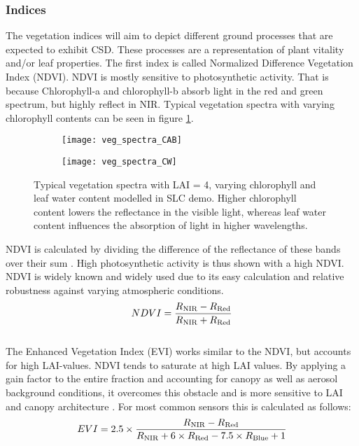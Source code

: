 \newpage
\subsubsection{Indices}
The vegetation indices will aim to depict different ground processes that are expected to exhibit CSD. These processes are a representation of plant vitality and/or leaf properties. The first index is called Normalized Difference Vegetation Index (NDVI). NDVI is mostly sensitive to photosynthetic activity. That is because Chlorophyll-a and chlorophyll-b absorb light in the red and green spectrum, but highly reflect in NIR. Typical vegetation spectra with varying chlorophyll contents can be seen in figure \ref{fig:vegspec}.

\begin{figure}[htp]
	\centering
	\begin{subfigure}{0.49\textwidth}	
		\centering
		\texttt{[image: veg\_spectra\_CAB]}
	\end{subfigure}
	\begin{subfigure}{0.49\textwidth}	
		\centering
		\texttt{[image: veg\_spectra\_CW]}
	\end{subfigure}
	\caption{Typical vegetation spectra with LAI = 4, varying chlorophyll and leaf water content modelled in SLC demo. Higher chlorophyll content lowers the reflectance in the visible light, whereas leaf water content influences the absorption of light in higher wavelengths.}\label{fig:vegspec}
\end{figure}	

NDVI is calculated by dividing the difference of the reflectance of these bands over their sum \citep[\textit{cf.} formula \ref{eq:ndvi}, after][]{tucker1979}. High photosynthetic activity is thus shown with a high NDVI. NDVI is widely known and widely used due to its easy calculation and relative robustness against varying atmospheric conditions.\\
\begin{equation}\label{eq:ndvi}
	NDVI = \frac{R\textsubscript{NIR} - R\textsubscript{Red}}{R\textsubscript{NIR} + R\textsubscript{Red}} 
\end{equation}\\

The Enhanced Vegetation Index (EVI) works similar to the NDVI, but accounts for high LAI-values. NDVI tends to saturate at high LAI values. By applying a gain factor to the entire fraction and accounting for canopy as well as aerosol background conditions, it overcomes this obstacle and is more sensitive to LAI and canopy architecture \citep{liu1995}. For most common sensors this is calculated as follows:\\
\begin{equation}\label{eq:evi}
	EVI = 2.5 \times \frac{R\textsubscript{NIR} - R\textsubscript{Red}}{R\textsubscript{NIR} + 6 \times R\textsubscript{Red} - 7.5 \times R\textsubscript{Blue} + 1}
\end{equation}\\

